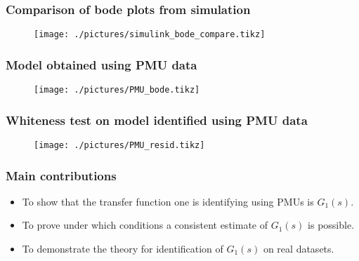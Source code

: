 \begin{frame}
	\frametitle{Comparison of bode plots from simulation}
	\begin{figure}
		\texttt{[image: ./pictures/simulink\_bode\_compare.tikz]}
	\end{figure}
\end{frame}
\begin{frame}
	\frametitle{Model obtained using PMU data}
	\begin{figure}
		\texttt{[image: ./pictures/PMU\_bode.tikz]}
	\end{figure}
\end{frame}
\begin{frame}
	\frametitle{Whiteness test on model identified using PMU data}
	\begin{figure}
		\texttt{[image: ./pictures/PMU\_resid.tikz]}
	\end{figure}
\end{frame}
\begin{frame}
	\frametitle{Main contributions}
	\begin{itemize}
		\item To show that the transfer function one is identifying using PMUs is $G_1(s)$.
		\item To prove under which conditions a consistent estimate of $G_1(s)$ is possible.
		\item To demonstrate the theory for identification of $G_1(s)$ on real datasets.
	\end{itemize}
\end{frame}
